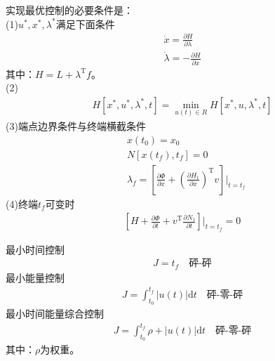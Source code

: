             \par
            实现最优控制的必要条件是：\\
            (1)$u^*,x^*,\lambda^*$满足下面条件
            \begin{align*}
            \dot{x} = \frac{\partial H}{\partial \lambda}\\
            \dot{\lambda} = -\frac{\partial H}{\partial x}
            \end{align*}
            其中：$H = L+\lambda^\mathrm{T}f$。\\
            (2)
            \begin{align*}
            H[x^*,u^*,\lambda^*,t] = \min_{u(t)\in R}H[x^*,u,\lambda^*,t]
            \end{align*}
            (3)端点边界条件与终端横截条件
            \begin{align*}
            & x(t_0) = x_0\\
            & N[x(t_f),t_f] = 0\\
            & \lambda_f = \left[ \frac{\partial \Phi}{\partial x}+ \left( \frac{\partial H_1}{\partial x} \right)^\mathrm{T}v  \right]\Big|_{t=t_f}
            \end{align*}
            (4)终端$t_f$可变时
            \begin{align*}
            \left[ H+\frac{\partial\Phi}{\partial t} +v^\mathrm{T}\frac{\partial N_1}{\partial t}\right]\Big|_{t = t_f} = 0
            \end{align*}
            \par
            最小时间控制
            \begin{align*}
            J = t_f\quad \text{砰-砰}
            \end{align*}
            最小能量控制
            \begin{align*}
            J = \int_{t_0}^{t_f}|u(t)|\mathrm{d}t \quad \text{砰-零-砰}
            \end{align*}
            最小时间能量综合控制
            \begin{align*}
            J = \int_{t_0}^{t_f} \rho+|u(t)| \mathrm{d}t\quad \text{砰-零-砰}
            \end{align*}
            其中：$\rho$为权重。
